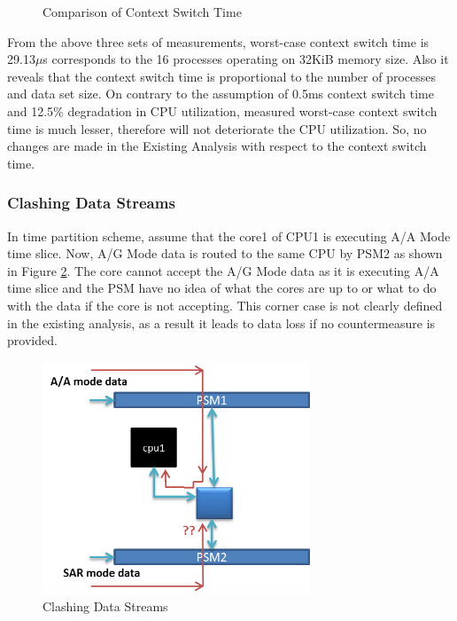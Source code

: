\begin{figure}[h!]
\centering
{}
\caption{Comparison of Context Switch Time}
\label{mm:cntxt_switch_graph}
\end{figure}

From the above three sets of measurements, worst-case context switch time is 29.13$\mu$s corresponds to the 16 processes operating on 32KiB memory size. Also it reveals that the context switch time is proportional to the number of processes and data set size. On contrary to the assumption of 0.5ms context switch time and 12.5\% degradation in CPU utilization, measured worst-case context switch time is much lesser, therefore will not deteriorate the CPU utilization. So, no changes are made in the Existing Analysis with respect to the context switch time.

\subsubsection{Clashing Data Streams}
In time partition scheme, assume that the core1 of CPU1 is executing A/A Mode time slice. Now, A/G Mode data is routed to the same CPU by PSM2 as shown in Figure \ref{fig:mm:data_clash}. The core cannot accept the A/G Mode data as it is executing A/A time slice and the PSM have no idea of what the cores are up to or what to do with the data if the core is not accepting. This corner case is not clearly defined in the existing analysis, as a result it leads to data loss if no countermeasure is provided.

\begin{figure}[h!]
	\centering
	\includegraphics[width=80mm]{figures/data_clash}
	\caption{Clashing Data Streams}
	\label{fig:mm:data_clash}
\end{figure}

